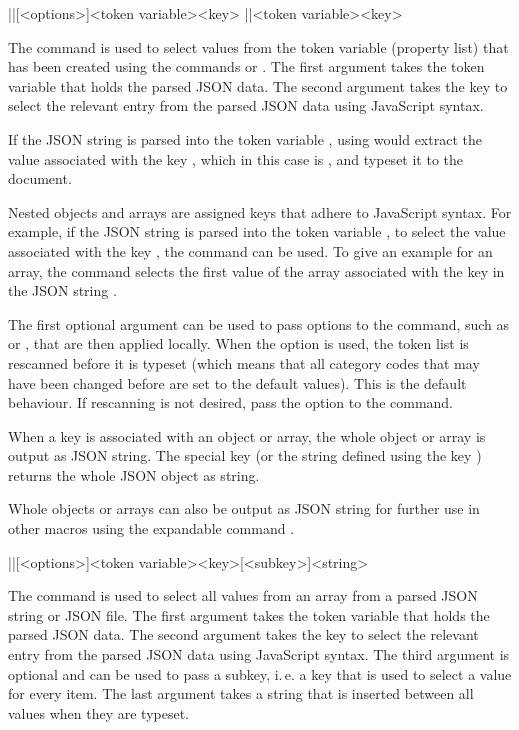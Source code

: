 \documentclass[a4paper]{article}
\begin{document}
{{\begin{macrodef}
|\JSONParseValue|[<options>]{<token variable>}{<key>}
|\JSONParseExpandableValue|{<token variable>}{<key>}
\end{macrodef}
The command \macro{\JSONParseValue} is used to select values from the token variable (property list) that has been created using the commands \macro{\JSONParse} or \macro{\JSONParseFromFile}. The first argument takes the token variable that holds the parsed JSON data. The second argument takes the key to select the relevant entry from the parsed JSON data using JavaScript syntax.

If the JSON string  is parsed into the token variable \macro{\myJSONdata}, using  would extract the value associated with the key , which in this case is , and typeset it to the document.

Nested objects and arrays are assigned keys that adhere to JavaScript syntax. For example, if the JSON string  is parsed into the token variable \macro{\myJSONdata}, to select the value associated with the key , the command  can be used. To give an example for an array, the command  selects the first value of the array associated with the key  in the JSON string .

The first optional argument can be used to pass options to the command, such as  or , that are then applied locally. When the option  is used, the token list is rescanned before it is typeset (which means that all category codes that may have been changed before are set to the default values). This is the default behaviour. If rescanning is not desired, pass the option  to the command.

When a key is associated with an object or array, the whole object or array is output as JSON string. The special key  (or the string defined using the key ) returns the whole JSON object as string. 

Whole objects or arrays can also be output as JSON string for further use in other macros using the expandable command \macro{\JSONParseExpandableValue}. 

\begin{macrodef}
|\JSONParseArrayValues|[<options>]{<token variable>}{<key>}[<subkey>]{<string>}
\end{macrodef}
The command \macro{\JSONParseArrayValues} is used to select all values from an array from a parsed JSON string or JSON file. The first argument takes the token variable that holds the parsed JSON data. The second argument takes the key to select the relevant entry from the parsed JSON data using JavaScript syntax. The third argument is optional and can be used to pass a subkey, i.\,e. a key that is used to select a value for every item. The last argument takes a string that is inserted between all values when they are typeset.

}}
\end{document}

